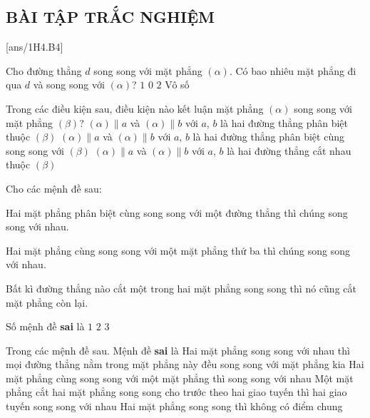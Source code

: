\subsection{BÀI TẬP TRẮC NGHIỆM}
[ans/1H4.B4]
\setcounter{ex}{0}

\begin{ex}%
	Cho đường thẳng $d$ song song với mặt phẳng $(\alpha  )$. Có bao nhiêu mặt phẳng đi qua $d$ và song song với $(\alpha  )$?
	\choice
	{\True $1$}
	{$0$}
	{$2$}
	{Vô số}
	\loigiai{}
\end{ex}

\begin{ex}%
	Trong các điều kiện sau, điều kiện nào kết luận mặt phẳng $(\alpha  )$ song song với mặt phẳng $(\beta )$?
	{$(\alpha )\parallel a$ và $(\alpha )\parallel b$ với $a$, $b$ là hai đường thẳng phân biệt thuộc $(\beta )$}
	{$(\alpha )\parallel a$ và $(\alpha )\parallel b$ với $a$, $b$ là hai đường thẳng phân biệt cùng song song với $(\beta )$}
	{\True $(\alpha )\parallel a$ và $(\alpha )\parallel b$ với $a$, $b$ là hai đường thẳng cắt nhau thuộc $(\beta )$} 
\end{ex}

\begin{ex}%
	Cho các mệnh đề sau:
	\begin{listEX}[1]
		\item [\ding{172}] Hai mặt phẳng phân biệt cùng song song với một đường thẳng thì chúng song song với nhau.
		\item [\ding{173}] Hai mặt phẳng cùng song song với một mặt phẳng thứ ba thì chúng song song với  nhau.
		\item [\ding{174}] Bất kì đường thẳng nào cắt một trong hai mặt phẳng song song thì nó cũng cắt mặt phẳng còn lại.
	\end{listEX}
	Số mệnh đề \textbf{sai} là
	{$1$}
	{\True $2$}
	{$3$}
\end{ex}

\begin{ex}%
	Trong các mệnh đề sau. Mệnh đề \textbf{sai} là
	\choice
	{Hai mặt phẳng song song với nhau thì mọi đường thẳng nằm trong mặt phẳng này đều song song
		với mặt phẳng kia}
	{\True Hai mặt phẳng cùng song song với một mặt phẳng thì song song với nhau}
	{Một mặt phẳng cắt hai mặt phẳng song song cho trước theo hai giao tuyến thì hai giao tuyến song
		song với nhau}
	{Hai mặt phẳng song song thì không có điểm chung}
\end{ex}


